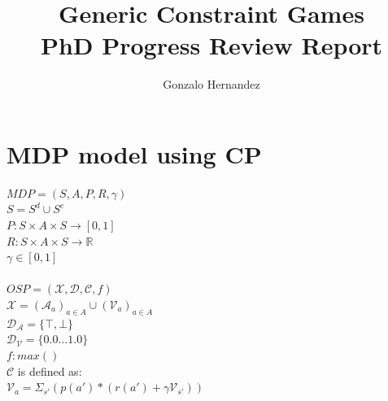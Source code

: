 \documentclass{article}
\title{Generic Constraint Games\\PhD Progress Review Report}
\author{Gonzalo Hernandez}
\date{}
\begin{document}
\section{MDP model using CP}

$MDP = (S,A,P,R,\gamma)$ \\
$S = S^d \cup S^c$ \\
$P: S \times A \times S \rightarrow [0,1]$ \\
$R: S \times A \times S \rightarrow \mathbb{R}$ \\
$\gamma \in [0,1]$ \\
\\
$OSP = (\mathcal{X},\mathcal{D},\mathcal{C},f)$ \\
$\mathcal{X} = (\mathcal{A}_a)_{a \in A} \cup (\mathcal{V}_a)_{a \in A}$\\
$\mathcal{D}_\mathcal{A} = \{ \top, \bot \}$ \\
$\mathcal{D}_\mathcal{V} = \{ 0.0 \dots 1.0 \}$ \\
$f : max()$ \\
$\mathcal{C}$ is defined as: \\
$\mathcal{V}_a = \Sigma_{s'} (p(a') * (r(a')+\gamma \mathcal{V}_{s'}))$
\end{document}
